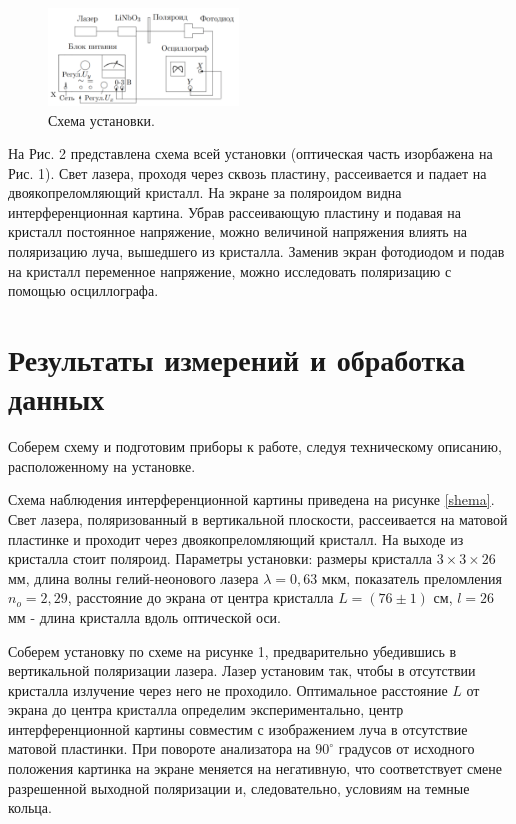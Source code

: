 \begin{figure}
\begin{center}
\includegraphics[width = 0.45\textwidth]{2.png}
\end{center}
\vspace{-40ptx}
\caption*{Схема установки.}
\end{figure}
На Рис. 2 представлена схема всей установки (оптическая часть изорбажена на Рис. 1). Свет лазера, проходя через сквозь пластину, рассеивается и падает на двоякопреломляющий кристалл. На экране за поляроидом видна интерференционная картина. Убрав рассеивающую пластину и подавая на кристалл постоянное напряжение, можно величиной напряжения влиять на поляризацию луча, вышедшего из кристалла. Заменив экран фотодиодом и подав на кристалл переменное напряжение, можно исследовать поляризацию с помощью осциллографа.


\section{Результаты измерений и обработка данных}

Соберем схему и подготовим приборы к работе, следуя техническому описанию, расположенному на установке.

	
	Схема наблюдения интерференционной картины приведена на рисунке \ref{shema}. Свет лазера, поляризованный в вертикальной плоскости, рассеивается на матовой пластинке и проходит через двоякопреломляющий кристалл. На выходе из кристалла стоит поляроид. Параметры установки: размеры кристалла $3 \times 3 \times 26$ мм, длина волны гелий-неонового лазера $\lambda = 0,63$ мкм, показатель преломления $n_o = 2,29$, расстояние до экрана от центра кристалла $L = (76 \pm 1)$ см, $l = 26$ мм - длина кристалла вдоль оптической оси.
	
Соберем установку по схеме на рисунке 1, предварительно убедившись в вертикальной поляризации лазера. Лазер установим так, чтобы в отсутствии кристалла излучение через него не проходило. Оптимальное расстояние $L$ от экрана до центра кристалла определим экспериментально, центр интерференционной картины совместим с изображением луча в отсутствие матовой пластинки. При повороте анализатора на $90^\circ$ градусов от исходного положения картинка на экране меняется на негативную, что соответствует смене разрешенной выходной поляризации и, следовательно, условиям на темные кольца. 
	
